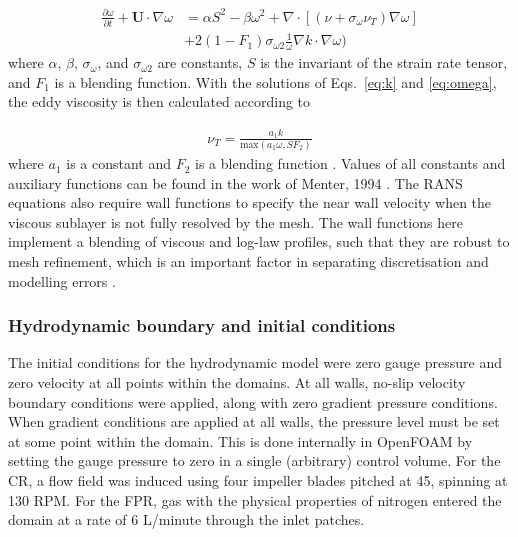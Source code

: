 \begin{align}
\frac{\partial \omega}{\partial t} + \mathbf{U} \cdot \nabla \omega &= \alpha S^2 - \beta \omega ^2 + \nabla \cdot \left[(\nu + \sigma_\omega \nu_T ) \nabla \omega  \right] \nonumber \\ 
&+ 2 (1 - F_1) \sigma_{\omega 2} \frac{1}{\omega} \nabla k \cdot \nabla \omega)
\label{eq:omega}
\end{align}
%
where $\alpha$, $\beta$, $\sigma_\omega$, and $\sigma_{\omega 2}$ are constants, $S$ is the invariant of the strain rate tensor, and $F_1$ is a blending function.
\skippingparagraph
With the solutions of Eqs.\ \ref{eq:k} and \ref{eq:omega}, the eddy viscosity is then calculated according to

\begin{align}
\nu_T = \frac{a_1 k}{\text{max}(a_1\omega, SF_2)}
\end{align}
%
where $a_1$ is a constant and $F_2$ is a blending function \cite{Menter1994}. Values of all constants and auxiliary functions can be found in the work of Menter, 1994 \cite{Menter1994}.
\skippingparagraph
The RANS equations also require wall functions to specify the near wall velocity when the viscous sublayer is not fully resolved by the mesh. The wall functions here implement a blending of viscous and log-law profiles, such that they are robust to mesh refinement, which is an important factor in separating discretisation and modelling errors \cite{Menter2003}.

\subsubsection{Hydrodynamic boundary and initial conditions}

The initial conditions for the hydrodynamic model were zero gauge pressure and zero velocity at all points within the domains. At all walls, no-slip velocity boundary conditions were applied, along with zero gradient pressure conditions. When gradient conditions are applied at all walls, the pressure level must be set at some point within the domain. This is done internally in OpenFOAM by setting the gauge pressure to zero in a single (arbitrary) control volume. For the CR, a flow field was induced using four impeller blades pitched at 45\degree, spinning at 130 RPM. For the FPR, gas with the physical properties of nitrogen entered the domain at a rate of 6 L/minute through the inlet patches. 

